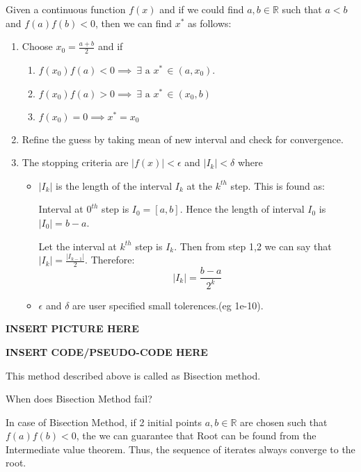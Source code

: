 \documentclass[
]{book}
\begin{document}
Given a continuous function \(f(x)\) and if we could find \(a,b\in \mathbb{R}\) such that \(a<b\) and \(f(a) f(b)<0\), then we can find \(x^*\) as follows:

\begin{enumerate}
\def\labelenumi{\arabic{enumi}.}
\item
  Choose \(x_0 = \frac{a+b}{2}\) and if

  \begin{enumerate}
  \def\labelenumii{\alph{enumii}.}
  \item
    \(f(x_0) f(a)<0 \implies \ \exists \text{ a } x^*\, \in (a,x_0)\).
  \item
    \(f(x_0) f(a)>0 \implies \ \exists \text{ a } x^*\, \in (x_0,b)\)
  \item
    \(f(x_0) =0 \implies x^* = x_0\)
  \end{enumerate}
\item
  Refine the guess by taking mean of new interval and check for convergence.
\item
  The stopping criteria are \(|f(x)|<\epsilon\) and \(|I_k|<\delta\) where

  \begin{itemize}
  \item
    \(|I_k|\) is the length of the interval \(I_k\) at the \(k^{th}\) step. This is found as:

    Interval at \(0^{th}\) step is \(I_0 = [a,b]\). Hence the length of interval \(I_0\) is \(|I_0|= b-a\).

    Let the interval at \(k^{th}\) step is \(I_k\). Then from step 1,2 we can say that \(|I_k| = \frac{|I_{k-1}|}{2}\). Therefore: \[|I_k| = \frac{b-a}{2^k}\]
  \item
    \(\epsilon\) and \(\delta\) are user specified small tolerences.(eg 1e-10).
  \end{itemize}
\end{enumerate}

\textbf{INSERT PICTURE HERE}

\textbf{INSERT CODE/PSEUDO-CODE HERE}

This method described above is called as Bisection method.

When does Bisection Method fail?

In case of Bisection Method, if 2 initial points \(a,b \in \mathbb{R}\) are chosen such that \(f(a)f(b)<0\), the we can guarantee that Root can be found from the Intermediate value theorem. Thus, the sequence of iterates always converge to the root.
\end{document}
